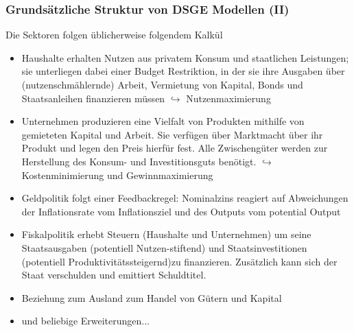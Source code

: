 \documentclass[10pt]{beamer}  %
\begin{document}
\begin{frame}
\frametitle{Grunds\"{a}tzliche Struktur von DSGE Modellen (II)}\footnotesize
Die Sektoren folgen \"{u}blicherweise folgendem Kalk\"{u}l
\begin{itemize}
  \item Haushalte erhalten Nutzen aus privatem Konsum und staatlichen Leistungen; sie unterliegen dabei einer Budget Restriktion, in der sie ihre Ausgaben \"{u}ber (nutzenschm\"{a}hlernde) Arbeit, Vermietung von Kapital,  Bonds und Staatsanleihen finanzieren m\"{u}ssen $\hookrightarrow$ Nutzenmaximierung
  \item Unternehmen produzieren eine Vielfalt von Produkten mithilfe von gemieteten Kapital und Arbeit. Sie verf\"{u}gen \"{u}ber Marktmacht \"{u}ber ihr Produkt und legen den Preis hierf\"{u}r fest. Alle Zwischeng\"{u}ter werden zur Herstellung des Konsum- und Investitionsguts ben\"{o}tigt. $\hookrightarrow$ Kostenminimierung und Gewinnmaximierung
  \item Geldpolitik folgt einer Feedbackregel: Nominalzins reagiert auf Abweichungen der Inflationsrate vom Inflationsziel und des Outputs vom potential Output
  \item Fiskalpolitik erhebt Steuern (Haushalte und Unternehmen) um seine Staatsausgaben (potentiell Nutzen-stiftend) und Staatsinvestitionen (potentiell Produktivit\"{a}tssteigernd)zu finanzieren. Zus\"{a}tzlich kann sich der Staat verschulden und emittiert Schuldtitel.
  \item Beziehung zum Ausland zum Handel von G\"{u}tern und Kapital
  \item und beliebige Erweiterungen...
\end{itemize}
\end{frame}
\end{document}

